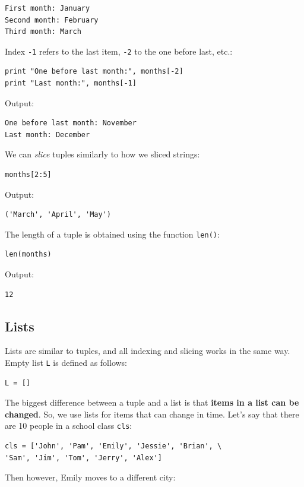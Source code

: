 \begin{verbatim}
First month: January
Second month: February
Third month: March
\end{verbatim}
Index {\tt -1} refers to the last item, {\tt -2} to the one before last, etc.:

\begin{verbatim}
print "One before last month:", months[-2]
print "Last month:", months[-1]
\end{verbatim}
Output:

\begin{verbatim}
One before last month: November
Last month: December
\end{verbatim}

\noindent
We can {\em slice} tuples similarly to how we sliced strings:

\begin{verbatim}
months[2:5]
\end{verbatim}
Output:

\begin{verbatim}
('March', 'April', 'May')
\end{verbatim}
The length of a tuple is obtained using the function {\tt len()}:

\begin{verbatim}
len(months)
\end{verbatim}
Output:

\begin{verbatim}
12
\end{verbatim}

\subsection{Lists}

Lists are similar to tuples, and all indexing and slicing works in the same way. 
Empty list {\tt L} is defined as follows:

\begin{verbatim}
L = []
\end{verbatim}
The biggest difference between a tuple 
and a list is that {\bf items in a list can be changed}. So, we use
lists for items that can change in time. Let's say that there are 
10 people in a school class {\tt cls}:

\begin{verbatim}
cls = ['John', 'Pam', 'Emily', 'Jessie', 'Brian', \
'Sam', 'Jim', 'Tom', 'Jerry', 'Alex']
\end{verbatim}
Then however, Emily moves to a different city:

